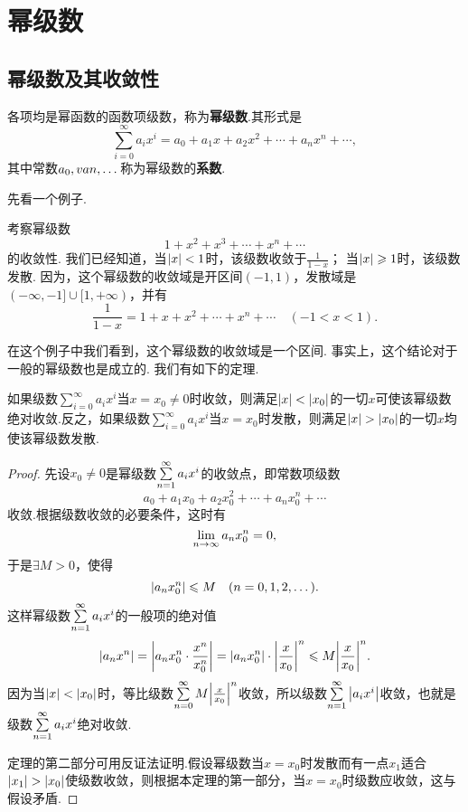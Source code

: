 \section{幂级数}
\subsection{幂级数及其收敛性}
\begin{definition}
各项均是幂函数的函数项级数，称为\textbf{幂级数}.其形式是\[
\sum\limits_{i=0}^{\infty}{a_i x^i}
= a_0 + a_1 x + a_2 x^2 + \dotsb + a_n x^n + \dotsb,
\]其中常数\(a_0,v{a}{n},\dotsc\)称为幂级数的\textbf{系数}.
\end{definition}

先看一个例子.
\begin{example}
考察幂级数\[
1+x^2+x^3+\dotsb+x^n+\dotsb
\]的收敛性.
我们已经知道，当\(\abs{x}<1\)时，该级数收敛于\(\frac{1}{1-x}\)；
当\(\abs{x}\geqslant1\)时，该级数发散.
因为，这个幂级数的收敛域是开区间\((-1,1)\)，发散域是\((-\infty,-1]\cup[1,+\infty)\)，并有\[
\frac{1}{1-x} = 1+x+x^2+\dotsb+x^n+\dotsb
\quad(-1<x<1).
\]
\end{example}

在这个例子中我们看到，这个幂级数的收敛域是一个区间.
事实上，这个结论对于一般的幂级数也是成立的.
我们有如下的定理.

\begin{theorem}\label{theorem:无穷级数.阿贝尔定理}
如果级数\(\sum\limits_{i=0}^{\infty} a_i x^i\)当\(x=x_0\neq0\)时收敛，则满足\(\abs{x}<\abs{x_0}\)的一切\(x\)可使该幂级数绝对收敛.反之，如果级数\(\sum\limits_{i=0}^{\infty} a_i x^i\)当\(x=x_0\)时发散，则满足\(\abs{x}>\abs{x_0}\)的一切\(x\)均使该幂级数发散.
\begin{proof}
先设\(x_0\neq0\)是幂级数\(\sum\limits_{n=1}^{\infty} a_i x^i\)的收敛点，即常数项级数\[
a_0 + a_1 x_0 + a_2 x_0^2 + \dotsb + a_n x_0^n + \dotsb
\]收敛.根据级数收敛的必要条件，这时有\[
\lim\limits_{n\to\infty} a_n x_0^n = 0,
\]于是\(\exists M > 0\)，使得\[
\abs{a_n x_0^n} \leqslant M
\quad (n=0,1,2,\dotsc).
\]这样幂级数\(\sum\limits_{n=1}^{\infty} a_i x^i\)的一般项的绝对值\[
\abs{a_n x^n} = \abs{a_n x_0^n \cdot \frac{x^n}{x_0^n}}
= \abs{a_n x_0^n} \cdot \abs{\frac{x}{x_0}}^n
\leqslant M \abs{\frac{x}{x_0}}^n.
\]因为当\(\abs{x}<\abs{x_0}\)时，等比级数\(\sum\limits_{n=0}^{\infty} M \abs{\frac{x}{x_0}}^n\)收敛，所以级数\(\sum\limits_{n=1}^{\infty} \abs{a_i x^i}\)收敛，也就是级数\(\sum\limits_{n=1}^{\infty} a_i x^i\)绝对收敛.

定理的第二部分可用反证法证明.假设幂级数当\(x=x_0\)时发散而有一点\(x_1\)适合\(\abs{x_1}>\abs{x_0}\)使级数收敛，则根据本定理的第一部分，当\(x=x_0\)时级数应收敛，这与假设矛盾.
\end{proof}
\end{theorem}

